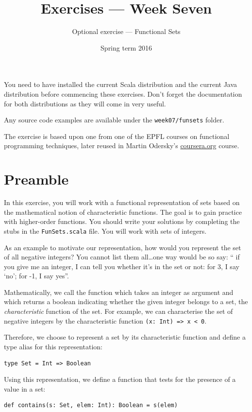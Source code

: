 \documentclass[a4paper,12pt]{exam}
\title{Exercises --- Week Seven}
\date{Spring term 2016}
\author{Optional exercise --- Functional Sets}
\begin{document}
\maketitle

You need to have installed the current Scala distribution and the current Java distribution
before commencing these exercises.
Don't forget the documentation for both distributions as they will come in very useful.

Any source code examples are available under the \verb!week07/funsets! folder.

The exercise is based upon one from one of the EPFL courses on functional programming techniques, 
later reused in Martin Odersky's \url{coursera.org} course.

\section*{Preamble}

In this exercise, you will work with a functional representation of sets based on the 
mathematical notion of characteristic functions. 
The goal is to gain practice with higher-order functions.
You should write your solutions by completing the stubs in the \verb!FunSets.scala! file.
You will work with sets of integers.

As an example to motivate our representation, how would you represent the set of all 
negative integers? You cannot list them all\ldots one way would be so say: ``
if you give me an integer, I can tell you whether it’s in the set or not: for 3, 
I say ‘no’; for -1, I say yes''.

Mathematically, we call the function which takes an integer as argument and which 
returns a boolean indicating whether the given integer belongs to a set, 
the \emph{characteristic} function of the set. 
For example, we can characterise the set of negative integers by the characteristic 
function \verb!(x: Int) => x < 0!.

Therefore, we choose to represent a set by its characteristic function and 
define a type alias for this representation:
\begin{Verbatim}
type Set = Int => Boolean	
\end{Verbatim}
Using this representation, we define a function that tests for the presence of a value in a set:
\begin{Verbatim}
def contains(s: Set, elem: Int): Boolean = s(elem)	
\end{Verbatim}
\end{document}
